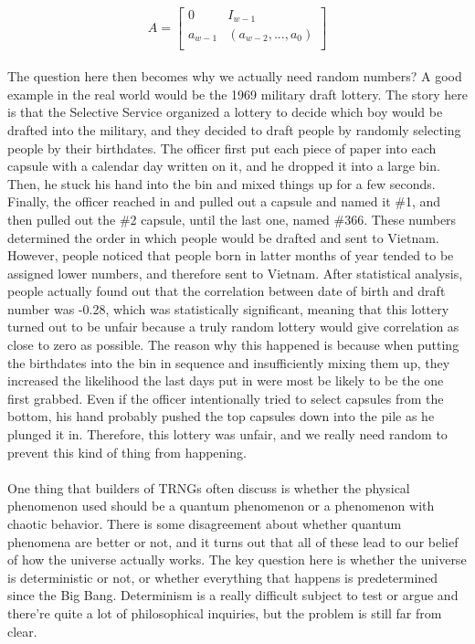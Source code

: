 \documentclass[12pt]{article}
\begin{document}
\[
   A=
  \left[ {\begin{array}{cc}
   0 & I_{w-1} \\
   a_{w-1} & (a_{w-2},...,a_0) \\
  \end{array} } \right]
\]
\\
The question here then becomes why we actually need random numbers? A good example in the real world would be the 1969 military draft lottery. The story here is that the Selective Service organized a lottery to decide which boy would be drafted into the military, and they decided to draft people by randomly selecting people by their birthdates. The officer first put each piece of paper into each capsule with a calendar day written on it, and he dropped it into a large bin. Then, he stuck his hand into the bin and mixed things up for a few seconds. Finally, the officer reached in and pulled out a capsule and named it \#1, and then pulled out the \#2 capsule, until the last one, named \#366. These numbers determined the order in which people would be drafted and sent to Vietnam. However, people noticed that people born in latter months of year tended to be assigned lower numbers, and therefore sent to Vietnam. After statistical analysis, people actually found out that the correlation between date of birth and draft number was -0.28, which was statistically significant, meaning that this lottery turned out to be unfair because a truly random lottery would give correlation as close to zero as possible. The reason why this happened is because when putting the birthdates into the bin in sequence and insufficiently mixing them up, they increased the likelihood the last days put in were most be likely to be the one first grabbed. Even if the officer intentionally tried to select capsules from the bottom, his hand probably pushed the top capsules down into the pile as he plunged it in. Therefore, this lottery was unfair, and we really need random to prevent this kind of thing from happening.\\\\
One thing that builders of TRNGs often discuss is whether the physical phenomenon used should be a quantum phenomenon or a phenomenon with chaotic behavior. There is some disagreement about whether quantum phenomena are better or not, and it turns out that all of these lead to our belief of how the universe actually works. The key question here is whether the universe is deterministic or not, or whether everything that happens is predetermined since the Big Bang. Determinism is a really difficult subject to test or argue and there’re quite a lot of philosophical inquiries, but the problem is still far from clear.
\end{document}
